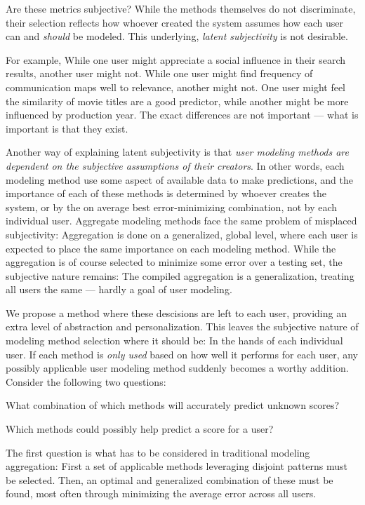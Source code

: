 Are these metrics subjective? 
While the methods themselves do not discriminate, their selection
reflects how whoever created the system assumes how each user
can and \emph{should} be modeled. This underlying, \emph{latent subjectivity} is not desirable.

For example, While one user might appreciate a social
influence in their search results, another user might not.
While one user might find frequency of communication maps well to relevance,
another might not. 
One user might feel the similarity of movie titles are a good predictor,
while another might be more influenced by production year.
The exact differences are not important --- what is important is that they exist.

Another way of explaining latent subjectivity is that 
\emph{user modeling methods are dependent on the subjective assumptions of their creators}.
In other words, each modeling method use some aspect of available data to make predictions,
and the importance of each of these methods is determined by whoever creates the system,
or by the on average best error-minimizing combination, not by each individual user.
Aggregate modeling methods face the same problem of misplaced subjectivity: 
Aggregation is done on a generalized, global level,
where each user is expected to place the same importance on each modeling method.
While the aggregation is of course selected to minimize some error over a testing set,
the subjective nature remains: The compiled aggregation is a generalization,
treating all users the same --- hardly a goal of user modeling.

We propose a method where these descisions are left to each user,
providing an extra level of abstraction and personalization.
This leaves the subjective nature of modeling method selection where it should be:
In the hands of each individual user.
If each method is \emph{only used} based on how well it performs for each user,
any possibly applicable user modeling method suddenly becomes a worthy addition.
Consider the following two questions:

\begin{enumerate*}
  \item What combination of which methods will accurately predict unknown scores?
  \item Which methods could possibly help predict a score for a user?
\end{enumerate*}

The first question is what has to be considered in traditional modeling aggregation:
First a set of applicable methods leveraging disjoint patterns must be selected. 
Then, an optimal and generalized combination of these must be found,
most often through minimizing the average error across all users.

